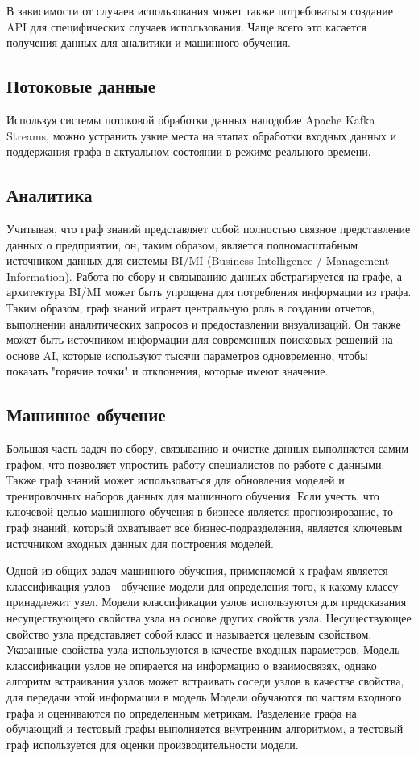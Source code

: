 В зависимости от случаев использования может также потребоваться создание API для специфических случаев использования. Чаще всего это касается
получения данных для аналитики и машинного обучения.

\subsection{Потоковые данные}

Используя системы потоковой обработки данных наподобие Apache Kafka Streams, можно устранить узкие места на этапах обработки входных данных
и поддержания графа в актуальном состоянии в режиме реального времени.

\subsection{Аналитика}

Учитывая, что граф знаний представляет собой полностью связное представление данных о предприятии, он, таким образом, является полномасштабным
источником данных для системы BI/MI (Business Intelligence / Management Information). Работа по сбору и связыванию данных абстрагируется на
графе, а архитектура BI/MI может быть упрощена для потребления информации из графа. Таким образом, граф знаний играет центральную роль в
создании отчетов, выполнении аналитических запросов и предоставлении визуализаций. Он также может быть источником информации для современных
поисковых решений на основе AI, которые используют тысячи параметров одновременно, чтобы показать "горячие точки" и отклонения, которые имеют значение.

\subsection{Машинное обучение}

Большая часть задач по сбору, связыванию и очистке данных выполняется самим графом, что позволяет упростить работу специалистов по работе с
данными. Также граф знаний может использоваться для обновления моделей и тренировочных наборов данных для машинного обучения. Если учесть,
что ключевой целью машинного обучения в бизнесе является прогнозирование, то граф знаний, который охватывает все бизнес-подразделения, является
ключевым источником входных данных для построения моделей.

Одной из общих задач машинного обучения, применяемой к графам является классификация узлов - обучение модели для определения того, к какому
классу принадлежит узел. Модели классификации узлов используются для предсказания несуществующего свойства узла на основе других свойств
узла. Несуществующее свойство узла представляет собой класс и называется целевым свойством. Указанные свойства узла используются в качестве
входных параметров. Модель классификации узлов не опирается на информацию о взаимосвязях, однако алгоритм встраивания узлов может встраивать
соседи узлов в качестве свойства, для передачи этой информации в модель Модели обучаются по частям входного графа и оцениваются по
определенным метрикам. Разделение графа на обучающий и тестовый графы выполняется внутренним алгоритмом, а тестовый граф используется для
оценки производительности модели.

